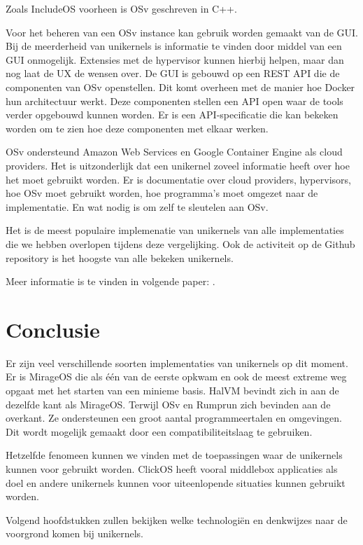 \documentclass[pdftex,a4paper,12pt,twoside]{report}
\begin{document}
Zoals IncludeOS voorheen is OSv geschreven in C++.

Voor het beheren van een OSv instance kan gebruik worden gemaakt van de GUI. Bij de meerderheid van unikernels is informatie te vinden door middel van een GUI onmogelijk. Extensies met de hypervisor kunnen hierbij helpen, maar dan nog laat de UX de wensen over. De GUI is gebouwd op een REST API die de componenten van OSv openstellen. Dit komt overheen met de manier hoe Docker hun architectuur werkt. Deze componenten stellen een API open waar de tools verder opgebouwd kunnen worden. Er is een API-specificatie die kan bekeken worden om te zien hoe deze componenten met elkaar werken.

OSv ondersteund Amazon Web Services en Google Container Engine als cloud providers. Het is uitzonderlijk dat een unikernel zoveel informatie heeft over hoe het moet gebruikt worden. Er is documentatie over cloud providers, hypervisors, hoe OSv moet gebruikt worden, hoe programma's moet omgezet naar de implementatie. En wat nodig is om zelf te sleutelen aan OSv.

Het is de meest populaire implemenatie van unikernels van alle implementaties die we hebben overlopen tijdens deze vergelijking. Ook de activiteit op de Github repository is het hoogste van alle bekeken unikernels.

Meer informatie is te vinden in volgende paper: \cite{kivity_osvoptimizing_2014}.

\section{Conclusie}

Er zijn veel verschillende soorten implementaties van unikernels op dit moment. Er is MirageOS die als één van de eerste opkwam en ook de meest extreme weg opgaat met het starten van een minieme basis. HalVM bevindt zich in aan de dezelfde kant als MirageOS. Terwijl OSv en Rumprun zich bevinden aan de overkant. Ze ondersteunen een groot aantal programmeertalen en omgevingen. Dit wordt mogelijk gemaakt door een compatibiliteitslaag te gebruiken. 

Hetzelfde fenomeen kunnen we vinden met de toepassingen waar de unikernels kunnen voor gebruikt worden. ClickOS heeft vooral middlebox applicaties als doel en andere unikernels kunnen voor uiteenlopende situaties kunnen gebruikt worden.

Volgend hoofdstukken zullen bekijken welke technologiën en denkwijzes naar de voorgrond komen bij unikernels.
\end{document}
